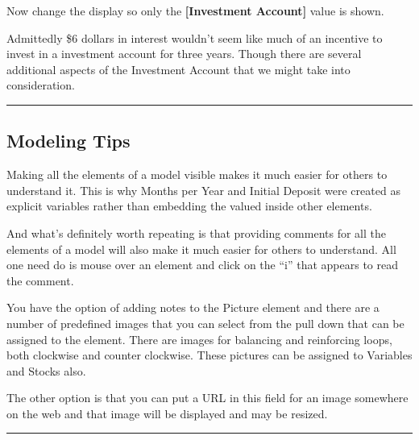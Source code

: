 \documentclass[]{memoir}
\newcommand{\p}[1]{\textbf{{[}#1{]}}}
\begin{document}
\begin{model}[frametitle={Model: Why Aren't We All Rich/Interest}]
Now change the display so only the \p{Investment Account} value is shown.







Admittedly \$6 dollars in interest wouldn't seem like much of an incentive to invest in a investment account for three years. Though there are several additional aspects of the Investment Account that we might take into consideration.




 \end{model}

\begin{center}\rule{3in}{0.4pt}\end{center}

\subsection{Modeling Tips}

Making all the elements of a model visible makes it much easier for
others to understand it. This is why Months per Year and Initial Deposit
were created as explicit variables rather than embedding the valued
inside other elements.

And what's definitely worth repeating is that providing comments for all
the elements of a model will also make it much easier for others to
understand. All one need do is mouse over an element and click on the
``i'' that appears to read the comment.

You have the option of adding notes to the Picture element and there are
a number of predefined images that you can select from the pull down
that can be assigned to the element. There are images for balancing and
reinforcing loops, both clockwise and counter clockwise. These pictures
can be assigned to Variables and Stocks also.

The other option is that you can put a URL in this field for an image
somewhere on the web and that image will be displayed and may be
resized.

\begin{center}\rule{3in}{0.4pt}\end{center}

\FloatBarrier 
\end{document}
